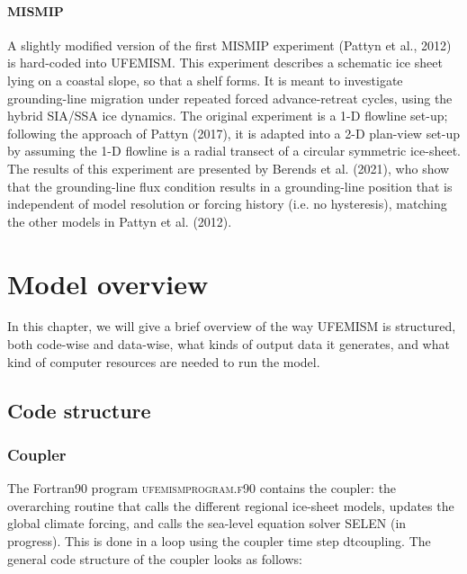 \documentclass{article}
\begin{document}
\paragraph{MISMIP}

A slightly modified version of the first MISMIP experiment (Pattyn et al., 2012) is hard-coded into UFEMISM. This experiment describes a schematic ice sheet lying on a coastal slope, so that a shelf forms. It is meant to investigate grounding-line migration under repeated forced advance-retreat cycles, using the hybrid SIA/SSA ice dynamics. The original experiment is a 1-D flowline set-up; following the approach of Pattyn (2017), it is adapted into a 2-D plan-view set-up by assuming the 1-D flowline is a radial transect of a circular symmetric ice-sheet. The results of this experiment are presented by Berends et al. (2021), who show that the grounding-line flux condition results in a grounding-line position that is independent of model resolution or forcing history (i.e. no hysteresis), matching the other models in Pattyn et al. (2012).


\newpage
\section{Model overview}

In this chapter, we will give a brief overview of the way UFEMISM is structured, both code-wise and data-wise, what kinds of output data it generates, and what kind of computer resources are needed to run the model.

\subsection{Code structure}

\subsubsection{Coupler}

The Fortran90 program \textsc{ufemism\textunderscore program.f90} contains the coupler: the overarching routine that calls the different regional ice-sheet models, updates the global climate forcing, and calls the sea-level equation solver SELEN (in progress). This is done in a loop using the coupler time step dt\textunderscore coupling. The general code structure of the coupler looks as follows:
\end{document}
